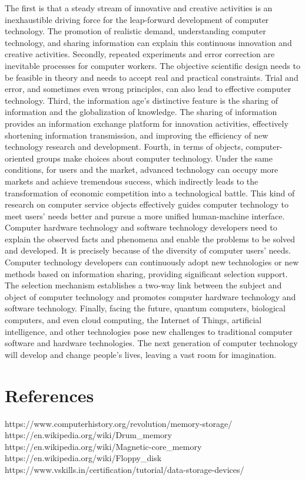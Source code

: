\documentclass{article}
\begin{document}
The first is that a steady stream of innovative and creative activities is an inexhaustible driving force for the leap-forward development of computer technology. The promotion of realistic demand, understanding computer technology, and sharing information can explain this continuous innovation and creative activities. Secondly, repeated experiments and error correction are inevitable processes for computer workers. The objective scientific design needs to be feasible in theory and needs to accept real and practical constraints. Trial and error, and sometimes even wrong principles, can also lead to effective computer technology. Third, the information age's distinctive feature is the sharing of information and the globalization of knowledge. The sharing of information provides an information exchange platform for innovation activities, effectively shortening information transmission, and improving the efficiency of new technology research and development. Fourth, in terms of objects, computer-oriented groups make choices about computer technology. Under the same conditions, for users and the market, advanced technology can occupy more markets and achieve tremendous success, which indirectly leads to the transformation of economic competition into a technological battle. This kind of research on computer service objects effectively guides computer technology to meet users' needs better and pursue a more unified human-machine interface. Computer hardware technology and software technology developers need to explain the observed facts and phenomena and enable the problems to be solved and developed. It is precisely because of the diversity of computer users' needs. Computer technology developers can continuously adopt new technologies or new methods based on information sharing, providing significant selection support. The selection mechanism establishes a two-way link between the subject and object of computer technology and promotes computer hardware technology and software technology. Finally, facing the future, quantum computers, biological computers, and even cloud computing, the Internet of Things, artificial intelligence, and other technologies pose new challenges to traditional computer software and hardware technologies. The next generation of computer technology will develop and change people's lives, leaving a vast room for imagination.  

\section{References}
https://www.computerhistory.org/revolution/memory-storage/\\
https://en.wikipedia.org/wiki/Drum\_memory\\
https://en.wikipedia.org/wiki/Magnetic-core\_memory\\
https://en.wikipedia.org/wiki/Floppy\_disk\\
https://www.vskills.in/certification/tutorial/data-storage-devices/\\
\end{document}
